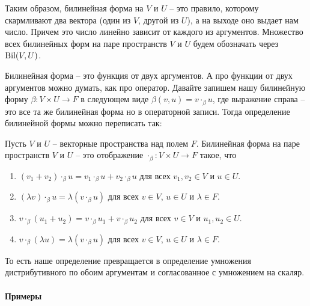 Таким образом, билинейная форма на $V$ и $U$ -- это правило, которому скармливают два вектора (один из $V$, другой из $U$), а на выходе оно выдает нам число.
Причем это число линейно зависит от каждого из аргументов.
Множество всех билинейных форм на паре пространств $V$ и $U$ будем обозначать через $\operatorname{Bil}(V,U)$.

Билинейная форма -- это функция от двух аргументов.
А про функции от двух аргументов можно думать, как про оператор.
Давайте запишем нашу билинейную форму $\beta\colon V\times U \to F$ в следующем виде $\beta(v,u) = v \cdot_\beta u$, где выражение справа -- это все та же билинейная форма но в операторной записи.
Тогда определение билинейной формы можно переписать так:
\begin{definition}
Пусть $V$ и $U$ -- векторные пространства над полем $F$.
Билинейная форма на паре пространств $V$ и $U$ -- это отображение $\cdot_\beta\colon V\times U \to F$ такое, что
\begin{enumerate}
\item $(v_1 + v_2)\cdot_\beta u = v_1\cdot_\beta u + v_2\cdot_\beta u$ для всех $v_1,v_2\in V$ и $u\in U$.

\item $(\lambda v)\cdot_\beta u = \lambda (v\cdot_\beta u)$ для всех $v\in V$, $u\in U$ и $\lambda\in F$.

\item $v\cdot_\beta( u_1+u_2) = v\cdot_\beta u_1 + v\cdot_\beta u_2$ для всех $v\in V$ и $u_1,u_2\in U$.

\item $v\cdot_\beta(\lambda u) = \lambda (v\cdot_\beta u)$ для всех $v\in V$, $u\in U$ и $\lambda\in F$.
\end{enumerate}
\end{definition}

То есть наше определение превращается в определение умножения дистрибутивного по обоим аргументам и согласованное с умножением на скаляр.



\paragraph{Примеры}


